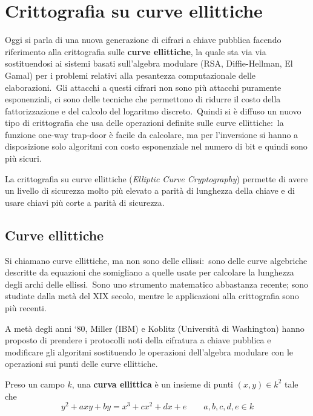 \chapter{Crittografia su curve ellittiche}

Oggi si parla di una nuova generazione di cifrari a chiave pubblica facendo riferimento alla crittografia sulle \textbf{curve ellittiche}, la quale sta via via sostituendosi ai sistemi basati sull'algebra modulare (RSA, Diffie-Hellman, El Gamal) per i problemi relativi alla pesantezza computazionale delle elaborazioni.\
Gli attacchi a questi cifrari non sono più attacchi puramente esponenziali, ci sono delle tecniche che permettono di ridurre il costo della fattorizzazione e del calcolo del logaritmo discreto.\
Quindi si è diffuso un nuovo tipo di crittografia che usa delle operazioni definite sulle curve ellittiche:\ la funzione one-way trap-door è facile da calcolare, ma per l'inversione si hanno a disposizione solo algoritmi con costo esponenziale nel numero di bit e quindi sono più sicuri.\

La crittografia su curve ellittiche (\textit{Elliptic Curve Cryptography}) permette di avere un livello di sicurezza molto più elevato a parità di lunghezza della chiave e di usare chiavi più corte a parità di sicurezza.\

\section{Curve ellittiche}

Si chiamano curve ellittiche, ma non sono delle ellissi:\ sono delle curve algebriche descritte da equazioni che somigliano a quelle usate per calcolare la lunghezza degli archi delle ellissi.\
Sono uno strumento matematico abbastanza recente; sono studiate dalla metà del XIX secolo, mentre le applicazioni alla crittografia sono più recenti.\

A metà degli anni `80, Miller (IBM) e Koblitz (Università di Washington) hanno proposto di prendere i protocolli noti della cifratura a chiave pubblica e modificare gli algoritmi sostituendo le operazioni dell'algebra modulare con le operazioni sui punti delle curve ellittiche.\

\begin{definition}
    Preso un campo $k$, una \textbf{curva ellittica} è un insieme di punti $(x, y) \in k^2$ tale che
    \[y^2 + axy + by = x^3 + cx^2 + dx + e\qquad a,b,c,d,e \in k \]
\end{definition}

